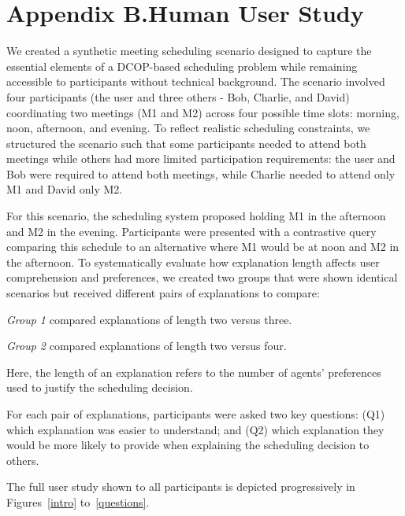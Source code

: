 \documentclass[twoside,11pt]{article}
\begin{document}
\clearpage
\clearpage

\section*{Appendix B.Human User Study}


 We created a synthetic meeting scheduling scenario designed to capture the essential elements of a DCOP-based scheduling problem while remaining accessible to participants without technical background. The scenario involved four participants (the user and three others - Bob, Charlie, and David) coordinating two meetings (M1 and M2) across four possible time slots: morning, noon, afternoon, and evening. To reflect realistic scheduling constraints, we structured the scenario such that some participants needed to attend both meetings while others had more limited participation requirements: the user and Bob were required to attend both meetings, while Charlie needed to attend only M1 and David only M2.


For this scenario, the scheduling system proposed holding M1 in the afternoon and M2 in the evening. Participants were presented with a contrastive query comparing this schedule to an alternative where M1 would be at noon and M2 in the afternoon. To systematically evaluate how explanation length affects user comprehension and preferences, we created two groups that were shown identical scenarios but received different pairs of explanations to compare: 


\squishlist
    \item \textit{Group 1} compared explanations of length two versus three.
    \item \textit{Group 2} compared explanations of length two versus four.
\squishend


Here, the length of an explanation refers to the number of agents' preferences used to justify the scheduling decision.

For each pair of explanations, participants were asked two key questions: (Q1) which explanation was easier to understand; and (Q2) which explanation they would be more likely to provide when explaining the scheduling decision to others. 

The full user study shown to all participants is depicted progressively in Figures~\ref{intro} to~\ref{questions}.
\end{document}
